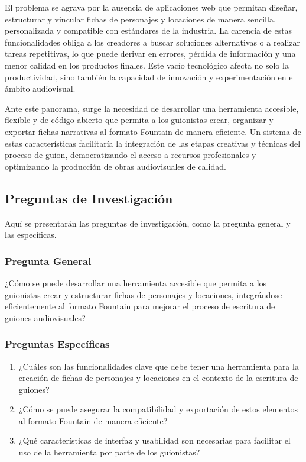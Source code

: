 \documentclass[12pt]{article}
\begin{document}
	El problema se agrava por la ausencia de aplicaciones web que permitan diseñar, estructurar y vincular fichas de personajes y locaciones de manera sencilla, personalizada y compatible con estándares de la industria. La carencia de estas funcionalidades obliga a los creadores a buscar soluciones alternativas o a realizar tareas repetitivas, lo que puede derivar en errores, pérdida de información y una menor calidad en los productos finales. Este vacío tecnológico afecta no solo la productividad, sino también la capacidad de innovación y experimentación en el ámbito audiovisual.

	Ante este panorama, surge la necesidad de desarrollar una herramienta accesible, flexible y de código abierto que permita a los guionistas crear, organizar y exportar fichas narrativas al formato Fountain de manera eficiente. Un sistema de estas características facilitaría la integración de las etapas creativas y técnicas del proceso de guion, democratizando el acceso a recursos profesionales y optimizando la producción de obras audiovisuales de calidad.

	\newpage

	\subsection{Preguntas de Investigación}

	Aquí se presentarán las preguntas de investigación, como la pregunta general y las específicas.

	\subsubsection{Pregunta General}
	¿Cómo se puede desarrollar una herramienta accesible que permita a los guionistas crear y estructurar fichas de personajes y locaciones, integrándose eficientemente al formato Fountain para mejorar el proceso de escritura de guiones audiovisuales?

	\subsubsection{Preguntas Específicas}
	\begin{enumerate}
		\item ¿Cuáles son las funcionalidades clave que debe tener una herramienta para la creación de fichas de personajes y locaciones en el contexto de la escritura de guiones?
		\item ¿Cómo se puede asegurar la compatibilidad y exportación de estos elementos al formato Fountain de manera eficiente?
		\item ¿Qué características de interfaz y usabilidad son necesarias para facilitar el uso de la herramienta por parte de los guionistas?
	\end{enumerate}
\end{document}

